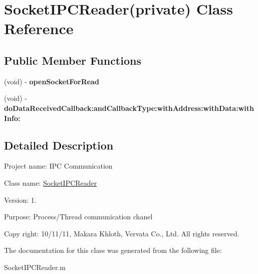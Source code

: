 \hypertarget{interface_socket_i_p_c_reader_07private_08}{
\section{\-Socket\-I\-P\-C\-Reader(private) \-Class \-Reference}
\label{interface_socket_i_p_c_reader_07private_08}
}
\subsection*{\-Public \-Member \-Functions}
\begin{DoxyCompactItemize}
\item 
\hypertarget{interface_socket_i_p_c_reader_07private_08_aee4bb43a6a25ec44769f58515dee89d3}{
(void) -\/ {\bfseries open\-Socket\-For\-Read}}
\label{interface_socket_i_p_c_reader_07private_08_aee4bb43a6a25ec44769f58515dee89d3}

\item 
\hypertarget{interface_socket_i_p_c_reader_07private_08_a0e33a480bcb63bca05eca29d7d9de8ab}{
(void) -\/ {\bfseries do\-Data\-Received\-Callback\-:and\-Callback\-Type\-:with\-Address\-:with\-Data\-:with\-Info\-:}}
\label{interface_socket_i_p_c_reader_07private_08_a0e33a480bcb63bca05eca29d7d9de8ab}

\end{DoxyCompactItemize}


\subsection{\-Detailed \-Description}

\begin{DoxyItemize}
\item \-Project name\-: \-I\-P\-C \-Communication
\item \-Class name\-: \hyperlink{interface_socket_i_p_c_reader}{\-Socket\-I\-P\-C\-Reader}
\item \-Version\-: 1.
\item \-Purpose\-: \-Process/\-Thread communication chanel
\item \-Copy right\-: 10/11/11, \-Makara \-Khloth, \-Vervata \-Co., \-Ltd. \-All rights reserved. 
\end{DoxyItemize}

\-The documentation for this class was generated from the following file\-:\begin{DoxyCompactItemize}
\item 
\-Socket\-I\-P\-C\-Reader.\-m\end{DoxyCompactItemize}
